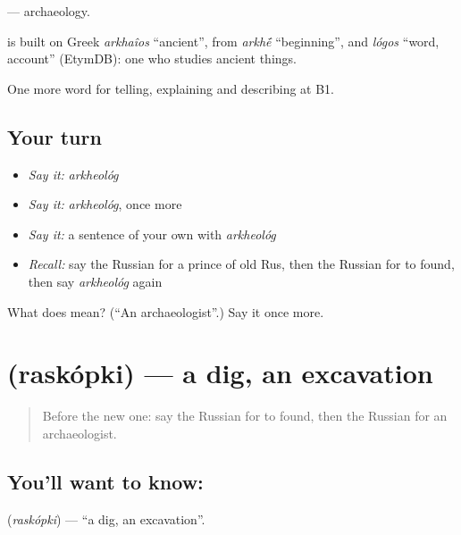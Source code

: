 \emph{} — archaeology.

\begin{cousinweb}
\emph{} is built on Greek \emph{arkhaîos} \textquotedblleft{}ancient\textquotedblright{}, from \emph{arkh\'{\={e}}} \textquotedblleft{}beginning\textquotedblright{}, and \emph{lógos} \textquotedblleft{}word, account\textquotedblright{} (EtymDB): one who studies ancient things.
\end{cousinweb}

\begin{grammarlens}[title={What you've built}]
One more word for telling, explaining and describing at B1.
\end{grammarlens}

\subsection*{Your turn}
\begin{itemize}
\raggedright
  \item \emph{Say it:} \emph{arkheológ}
  \item \emph{Say it:} \emph{arkheológ}, once more
  \item \emph{Say it:} a sentence of your own with \emph{arkheológ}
  \item \emph{Recall:} say the Russian for a prince of old Rus, then the Russian for to found, then say \emph{arkheológ} again
\end{itemize}

\begin{tcolorbox}[breakable,colback=teal!4,colframe=teal!35!black,title={Before you move on}]
What does  mean? (\textquotedblleft{}An archaeologist\textquotedblright{}.) Say it once more.
\end{tcolorbox}
\section[\texorpdfstring{\ru{раскопки} (raskópki)}{раскопки (raskópki)}]{ (raskópki) — a dig, an excavation}

\label{lesson:RU-C327-raskopki}



\begin{quote}
Before the new one: say the Russian for to found, then the Russian for an archaeologist.
\end{quote}

\subsection*{You'll want to know: }
\textbf{} (\emph{raskópki}) — \textquotedblleft{}a dig, an excavation\textquotedblright{}.

